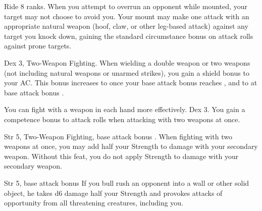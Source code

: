 Ride 8 ranks.
 When you attempt to overrun an opponent while mounted, your target may not choose to avoid you. Your mount may make one attack with an appropriate natural weapon (hoof, claw, or other leg-based attack) against any target you knock down, gaining the standard  circumstance bonus on attack rolls against prone targets.

 Dex 3, Two-Weapon Fighting.
 When wielding a double weapon or two weapons (not including natural weapons or unarmed strikes), you gain a  shield bonus to your AC. This bonus increases to  once your base attack bonus reaches , and to  at base attack bonus .

\label{feat:Two-Weapon Fighting}
You can fight with a weapon in each hand more effectively.
 Dex 3.
 You gain a  competence bonus to attack rolls when attacking with two weapons at once.

\label{Two-Weapon Rend}
 Str 5, Two-Weapon Fighting, base attack bonus .
 When fighting with two weapons at once, you may add half your Strength to damage with your secondary weapon.
 Without this feat, you do not apply Strength to damage with your secondary weapon.

\featpre Str 5, base attack bonus 
\featben If you bull rush an opponent into a wall or other solid object, he takes d6 damage \add half your Strength and provokes attacks of opportunity from all threatening creatures, including you.

